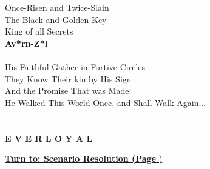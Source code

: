 \begin{center}
\vspace*{\fill}
{\Large
Once-Risen and Twice-Slain\\
The Black and Golden Key\\
King of all Secrets\\
\textbf{Av*rn-Z*l}\\
\ \\
His Faithful Gather in Furtive Circles\\
They Know Their kin by His Sign\\
And the Promise That was Made:\\
He Walked This World Once, and Shall Walk Again...\\
\ \\
\ \\
{\Huge \textbf{E V E R L O Y A L }}
}
\vspace*{\fill}
\end{center}

\hyperlink{scenres}{\textbf{Turn to: Scenario Resolution (Page \pageref{scenres}})}
